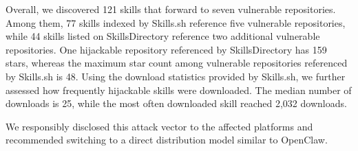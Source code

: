 Overall, we discovered 121 skills that forward to seven vulnerable repositories. Among them, 77 skills indexed by Skills.sh reference five vulnerable repositories, while 44 skills listed on SkillsDirectory reference two additional vulnerable repositories. One hijackable repository referenced by SkillsDirectory has 159 stars, whereas the maximum star count among vulnerable repositories referenced by Skills.sh is 48. 
Using the download statistics provided by Skills.sh, we further assessed how frequently hijackable skills were downloaded. The median number of downloads is 25, while the most often downloaded skill reached 2,032 downloads. 

We responsibly disclosed this attack vector to the affected platforms and recommended switching to a direct distribution model similar to OpenClaw. 

